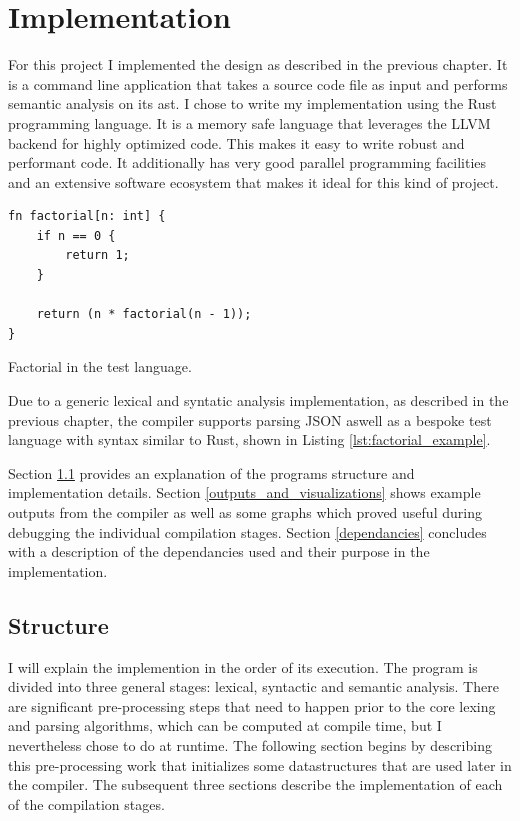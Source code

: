 \chapter{Implementation} \label{implementation}

For this project I implemented the design as described in the previous chapter.
It is a command line application that takes a source code file as input and
performs semantic analysis on its \gls{ast}. I chose to write my implementation
using the Rust programming language. It is a memory safe language that leverages
the LLVM backend for highly optimized code. This makes it easy to write
robust and performant code. It additionally has very good parallel programming
facilities and an extensive software ecosystem that makes it ideal for this kind
of project. 

\begin{listing}[H]
\begin{verbatim}
fn factorial[n: int] {
    if n == 0 {
        return 1;
    } 

    return (n * factorial(n - 1));
}
\end{verbatim}
\caption{Factorial in the test language.}
\label{lst:factorial_example}
\end{listing}

Due to a generic lexical and syntatic analysis implementation, as described in the previous chapter,
the compiler supports parsing JSON aswell as a bespoke test language with syntax similar to Rust,
shown in Listing \ref{lst:factorial_example}.

Section \ref{structure} provides an explanation of the programs structure and implementation
details.
\newline \newline
Section \ref{outputs_and_visualizations} shows example outputs from the compiler as well as some
graphs which proved useful during debugging the individual compilation stages.
\newline \newline
Section \ref{dependancies} concludes with a description of the dependancies used and their purpose
in the implementation.

\section{Structure} \label{structure}

I will explain the implemention in the order of its execution. The program is divided into three
general stages: lexical, syntactic and semantic analysis. There are significant pre-processing
steps that need to happen prior to the core lexing and parsing algorithms, which can be computed at
compile time, but I nevertheless chose to do at runtime. The following section begins by describing
this pre-processing work that initializes some datastructures that are used later in the compiler.
The subsequent three sections describe the implementation of each of the compilation stages.

